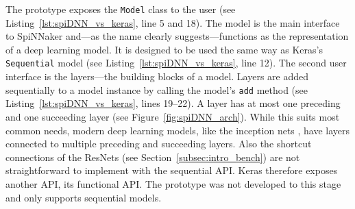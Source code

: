 \documentclass[]{article}
\begin{document}
The prototype exposes the \texttt{Model} class to the user
(see Listing~\ref{lst:spiDNN_vs_keras}, line 5 and 18).
The model is the main interface to SpiNNaker and---as the name
clearly suggests---functions as the representation of a deep learning
model.
It is designed to be used the same way as Keras's \texttt{Sequential}
model (see Listing~\ref{lst:spiDNN_vs_keras}, line 12).
The second user interface is the layers---the building blocks of
a model.
Layers are added sequentially to a model instance by calling the
model's \texttt{add} method (see Listing~\ref{lst:spiDNN_vs_keras},
lines 19--22).
A layer has at most one preceding and one succeeding layer
(see Figure~\ref{fig:spiDNN_arch}).
While this suits most common needs, modern deep learning models,
like the inception nets \citep{szegedy_et_al_2014}, have layers
connected to multiple preceding and succeeding layers.
Also the shortcut connections of the ResNets (see
Section~\ref{subsec:intro_bench}) are not straightforward to
implement with the sequential API.
Keras therefore exposes another API, its functional API.
The prototype was not developed to this stage and only supports
sequential models.
\end{document}
